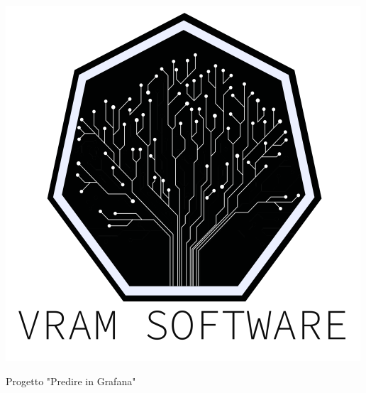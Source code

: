 \setlength{\headheight}{39pt} %
\begin{titlepage}
	\begin{center}
		\includegraphics[scale=0.6]{img/logo.png} \\ %
		\vspace{0.5cm} %
		
		{\LARGE Progetto "Predire in Grafana"} \\ %
		\vspace{0.5cm} %
		
		{\Huge \textbf{\DocTitle}} \\ %
		\vspace{0.5cm}
		
		\DocDate \\ %
		\vspace{1cm}
		
		

\end{center}
\end{titlepage}
